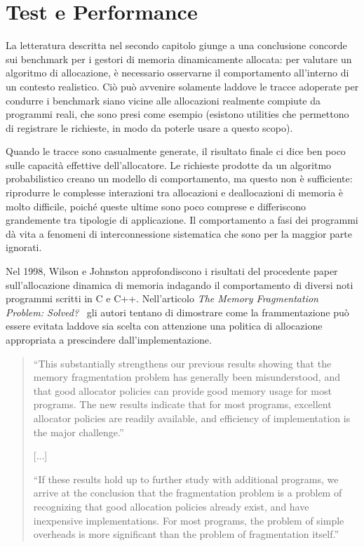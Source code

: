 \chapter[Test e Performance]{Test e Performance}

La letteratura descritta nel secondo capitolo giunge a una conclusione concorde sui benchmark per i gestori di memoria dinamicamente allocata: per valutare un algoritmo di allocazione, è necessario osservarne il comportamento all’interno di un contesto realistico. Ciò può avvenire solamente laddove le tracce adoperate per condurre i benchmark siano vicine alle allocazioni realmente compiute da programmi reali, che sono presi come esempio (esistono utilities che permettono di registrare le richieste, in modo da poterle usare a questo scopo).

Quando le tracce sono casualmente generate, il risultato finale ci dice ben poco sulle capacità effettive dell’allocatore. Le richieste prodotte da un algoritmo probabilistico creano un modello di comportamento, ma questo non è sufficiente: riprodurre le complesse interazioni tra allocazioni e deallocazioni di memoria è molto difficile, poiché queste ultime sono poco comprese e differiscono grandemente tra tipologie di applicazione. Il comportamento a fasi dei programmi dà vita a fenomeni di interconnessione sistematica che sono per la maggior parte ignorati.

Nel 1998, Wilson e Johnston approfondiscono i risultati del procedente paper sull’allocazione dinamica di memoria indagando il comportamento di diversi noti programmi scritti in C e C++. Nell’articolo \emph{The Memory Fragmentation Problem: Solved?}~\cite{wilson1998} gli autori tentano di dimostrare come la frammentazione può essere evitata laddove sia scelta con attenzione una politica di allocazione appropriata a prescindere dall’implementazione.

\begin{quote}
``This substantially strengthens our previous results showing that the memory fragmentation problem has generally been misunderstood, and that good allocator policies can provide good memory usage for most programs. The new results indicate that for most programs, excellent allocator policies are readily available, and efficiency of implementation is the major challenge.''

\begin{center}
[...]
\end{center}

``If these results hold up to further study with additional programs, we arrive at the conclusion that the fragmentation problem is a problem of recognizing that good allocation policies already exist, and have inexpensive implementations. For most programs, the problem of simple overheads is more significant than the problem of fragmentation itself.''
\end{quote} 

